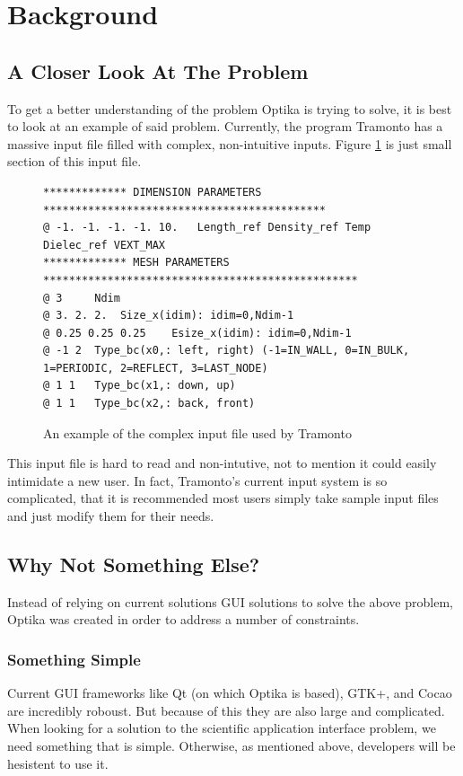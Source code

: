 \section{Background}
\subsection{A Closer Look At The Problem}
To get a better understanding of the problem Optika is trying to solve, it is
best to look at an example of said problem. Currently, the program Tramonto has
a massive input file filled with complex, non-intuitive inputs. Figure
\ref{tramontoInputFigure} is just small section of this input file.
\begin{figure}[h]
  \centering
  {\footnotesize
  \begin{verbatim}
************* DIMENSION PARAMETERS ********************************************
@ -1. -1. -1. -1. 10. 	Length_ref Density_ref Temp Dielec_ref VEXT_MAX 
************* MESH PARAMETERS *************************************************
@ 3 	Ndim 
@ 3. 2. 2. 	Size_x(idim): idim=0,Ndim-1 
@ 0.25 0.25 0.25 	Esize_x(idim): idim=0,Ndim-1 
@ -1 2 	Type_bc(x0,: left, right) (-1=IN_WALL, 0=IN_BULK, 1=PERIODIC, 2=REFLECT, 3=LAST_NODE) 
@ 1 1 	Type_bc(x1,: down, up) 
@ 1 1 	Type_bc(x2,: back, front) 
  \end{verbatim}
  }
  \caption[Tramonto Input]{An example of the complex input file used by Tramonto}
  \label{tramontoInputFigure}
\end{figure}

This input file is hard to read and non-intutive, not to mention it could 
easily intimidate
a new user. In fact, Tramonto's current input system is so complicated, 
that it is recommended most users simply take sample input files and just 
modify them for their needs.

\subsection{Why Not Something Else?}
Instead of relying on current solutions GUI solutions to solve the above problem, Optika was created in order to address
a number of constraints.
\subsubsection{Something Simple}
Current GUI frameworks like Qt (on which Optika is based), GTK+, and Cocao are incredibly roboust. But
because of this they are also large and complicated. When looking for a solution to the 
scientific application interface problem, we need something that is simple. Otherwise, as mentioned
above, developers will be hesistent to use it.

